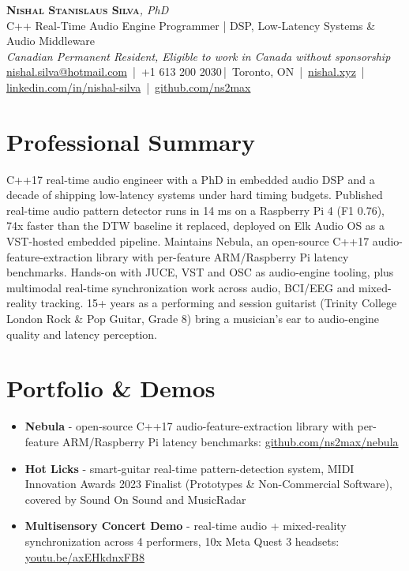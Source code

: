 \documentclass[11pt]{article}
\makeatletter
\newcommand{\cvName}{Nishal Stanislaus Silva}
\newcommand{\cvEmail}{nishal.silva@hotmail.com}
\newcommand{\cvPhone}{+1 613 200 2030}
\newcommand{\cvCity}{Toronto, ON}
\newcommand{\cvSite}{https://nishal.xyz}
\newcommand{\cvLinkedIn}{https://www.linkedin.com/in/nishal-silva}
\newcommand{\cvGitHub}{https://github.com/ns2max}
\newcommand{\cvStatus}{Canadian Permanent Resident, Eligible to work in Canada without sponsorship}
\newcommand{\cvTagline}{C++ Real-Time Audio Engine Programmer | DSP, Low-Latency Systems \& Audio Middleware}
\makeatother
\begin{document}
\pagestyle{empty}
\begin{center}
    {\LARGE \scshape \textbf{\cvName}}{\large \textit{, PhD}}\\[1pt]
    {\small \cvTagline}\\[1pt]
    {\footnotesize\textit{\cvStatus}}\\[1pt]
    {\small
    \href{mailto:\cvEmail}{\cvEmail} \,|\, \cvPhone \,|\, \cvCity
    \,|\, \href{\cvSite}{nishal.xyz} \,|\, \href{\cvLinkedIn}{linkedin.com/in/nishal-silva}
    \,|\, \href{\cvGitHub}{github.com/ns2max}}
\end{center}

\section*{Professional Summary}
C++17 real-time audio engineer with a PhD in embedded audio DSP and a decade of shipping low-latency systems under hard timing budgets. Published real-time audio pattern detector runs in 14 ms on a Raspberry Pi 4 (F1 0.76), 74x faster than the DTW baseline it replaced, deployed on Elk Audio OS as a VST-hosted embedded pipeline. Maintains Nebula, an open-source C++17 audio-feature-extraction library with per-feature ARM/Raspberry Pi latency benchmarks. Hands-on with JUCE, VST and OSC as audio-engine tooling, plus multimodal real-time synchronization work across audio, BCI/EEG and mixed-reality tracking. 15+ years as a performing and session guitarist (Trinity College London Rock \& Pop Guitar, Grade 8) bring a musician's ear to audio-engine quality and latency perception.

\section*{Portfolio \& Demos}
\begin{itemize}[leftmargin=2em, itemsep=-0.2em, topsep=0.1em]
    \item \textbf{Nebula} - open-source C++17 audio-feature-extraction library with per-feature ARM/Raspberry Pi latency benchmarks: \href{https://github.com/ns2max/nebula}{github.com/ns2max/nebula}
    \item \textbf{Hot Licks} - smart-guitar real-time pattern-detection system, MIDI Innovation Awards 2023 Finalist (Prototypes \& Non-Commercial Software), covered by Sound On Sound and MusicRadar
    \item \textbf{Multisensory Concert Demo} - real-time audio + mixed-reality synchronization across 4 performers, 10x Meta Quest 3 headsets: \href{https://youtu.be/axEHkdnxFB8}{youtu.be/axEHkdnxFB8}
\end{itemize}
\end{document}

